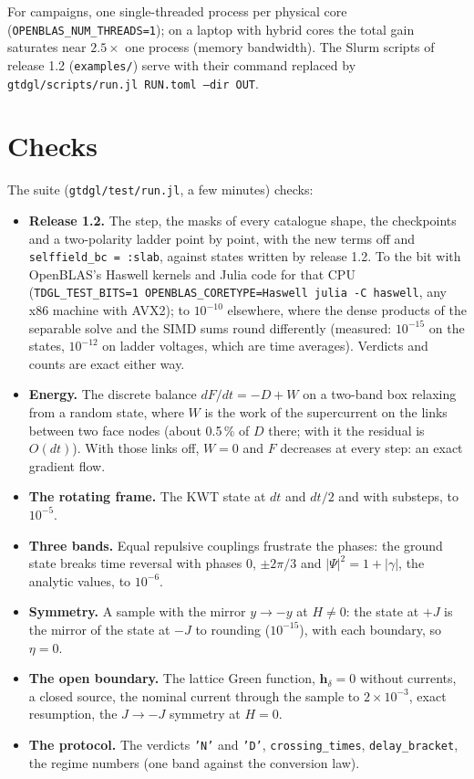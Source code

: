 \documentclass[11pt,a4paper]{article}
\newcommand{\code}[1]{\texttt{#1}}
\begin{document}
For campaigns, one single-threaded process per physical core (\code{OPENBLAS\_NUM\_THREADS=1}); on a laptop with hybrid
cores the total gain saturates near $2.5\times$ one process (memory bandwidth). The Slurm scripts of release 1.2
(\code{examples/}) serve with their command replaced by \code{gtdgl/scripts/run.jl RUN.toml --dir OUT}.

\section{Checks}

The suite (\code{gtdgl/test/run.jl}, a few minutes) checks:
\begin{itemize}
\item \textbf{Release 1.2.} The step, the masks of every catalogue shape, the checkpoints and a two-polarity ladder point
  by point, with the new terms off and \code{selffield\_bc = :slab}, against states written by release 1.2. To the bit
  with OpenBLAS's Haswell kernels and Julia code for that CPU (\code{TDGL\_TEST\_BITS=1 OPENBLAS\_CORETYPE=Haswell julia
  -C haswell}, any x86 machine with AVX2); to $10^{-10}$ elsewhere, where the dense products of the separable solve and
  the SIMD sums round differently (measured: $10^{-15}$ on the states, $10^{-12}$ on ladder voltages, which are time
  averages). Verdicts and counts are exact either way.
\item \textbf{Energy.} The discrete balance $dF/dt = -D + W$ on a two-band box relaxing from a random state, where $W$
  is the work of the supercurrent on the links between two face nodes (about 0.5\,\% of $D$ there; with it the residual
  is $O(dt)$). With those links off, $W = 0$ and $F$ decreases at every step: an exact gradient flow.
\item \textbf{The rotating frame.} The KWT state at $dt$ and $dt/2$ and with substeps, to $10^{-5}$.
\item \textbf{Three bands.} Equal repulsive couplings frustrate the phases: the ground state breaks time reversal with
  phases $0$, $\pm2\pi/3$ and $|\Psi|^2 = 1 + |\gamma|$, the analytic values, to $10^{-6}$.
\item \textbf{Symmetry.} A sample with the mirror $y\to-y$ at $H\neq0$: the state at $+J$ is the mirror of the state at
  $-J$ to rounding ($10^{-15}$), with each boundary, so $\eta = 0$.
\item \textbf{The open boundary.} The lattice Green function, $\mathbf h_\delta = 0$ without currents, a closed source,
  the nominal current through the sample to $2\times10^{-3}$, exact resumption, the $J\to-J$ symmetry at $H = 0$.
\item \textbf{The protocol.} The verdicts \code{'N'} and \code{'D'}, \code{crossing\_times}, \code{delay\_bracket}, the regime numbers
  (one band against the conversion law).
\end{itemize}
\end{document}
